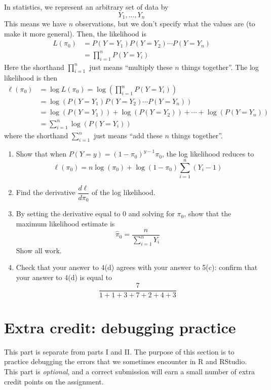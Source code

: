\documentclass[11pt]{article}
\begin{document}
\begin{enumerate}
In statistics, we represent an arbitrary set of data by
$$Y_1,...,Y_n$$
This means we have $n$ observations, but we don't specify what the values are (to make it more general). Then, the likelihood is
\begin{align*}
L(\pi_0) &= P(Y = Y_1)P(Y = Y_2) \cdots P(Y = Y_n) \\
&= \prod \limits_{i=1}^n P(Y = Y_i)
\end{align*}
Here the shorthand $\prod \limits_{i=1}^n$ just means ``multiply these $n$ things together''. The log likelihood is then
\begin{align*}
\ell(\pi_0) &= \log L(\pi_0) = \log \left( \prod \limits_{i=1}^n P(Y = Y_i) \right) \\
&= \log \left( P(Y = Y_1)P(Y = Y_2) \cdots P(Y = Y_n) \right) \\
&= \log(P(Y = Y_1)) + \log(P(Y = Y_2)) + \cdots + \log(P(Y = Y_n)) \\
&= \sum \limits_{i=1}^n \log (P(Y = Y_i))
\end{align*}
where the shorthand $\sum \limits_{i=1}^n$ just means ``add these $n$ things together''.

\begin{enumerate}
\item Show that when $P(Y = y) = (1 - \pi_0)^{y-1} \pi_0$, the log likelihood reduces to
$$\ell(\pi_0) = n \log(\pi_0) + \log(1 - \pi_0) \sum \limits_{i=1}^n (Y_i - 1)$$

\item Find the derivative $\dfrac{d \ell}{d \pi_0}$ of the log likelihood.

\item By setting the derivative equal to 0 and solving for $\pi_0$, show that the maximum likelihood estimate is 
$$\widehat{\pi}_0 = \dfrac{n}{\sum \limits_{i=1}^n Y_i}$$
Show all work.

\item Check that your answer to 4(d) agrees with your answer to 5(c): confirm that your answer to 4(d) is equal to
$$\dfrac{7}{1 + 1 + 3 + 7 + 2 + 4 + 3}$$
\end{enumerate}

\end{enumerate}

\newpage

\section{Extra credit: debugging practice}

This part is separate from parts I and II. The purpose of this section is to practice debugging the errors that we sometimes encounter in R and RStudio. This part is \textit{optional}, and a correct submission will earn a small number of extra credit points on the assignment.
\end{document}
